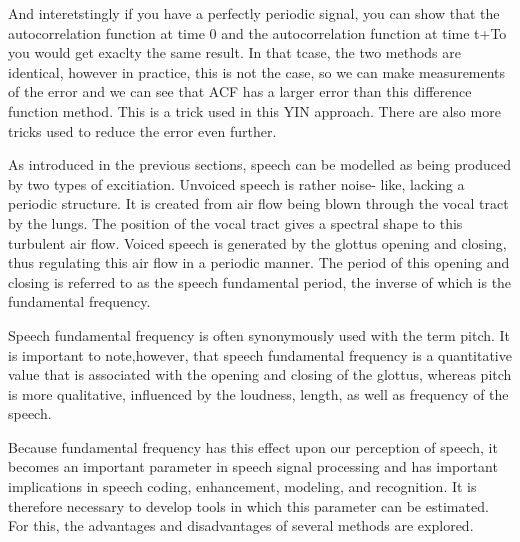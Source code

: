 And interetstingly if you have a perfectly periodic signal, you can show that the autocorrelation function at time 0 and the autocorrelation function at time t+To you would get exaclty the same result. In that tcase, the two methods are identical, however in practice, this is not the case, so we can make measurements of the error and we can see that ACF has a larger error than this difference function method. This is a trick used in this YIN approach.  There are also more tricks used to reduce the error even further.  




























As introduced in the previous sections, speech can be modelled as being produced by two types of excitiation. Unvoiced speech is rather noise- like, lacking a periodic structure.  It is created from air flow being blown through the vocal tract by the lungs. The position of the vocal tract gives a spectral shape to this turbulent air flow.  Voiced speech is generated by the glottus opening and closing, thus regulating this air flow in a periodic manner.  The period of this opening and closing is referred to as the speech fundamental period, the inverse of which is the fundamental frequency.

Speech fundamental frequency is often synonymously used with the term pitch.  It is important to note,however, that speech fundamental frequency is a quantitative value that is associated with the opening and closing of the glottus, whereas pitch is more qualitative, influenced by the loudness, length, as well as frequency of the speech.

Because fundamental frequency has this effect upon our perception of speech, it becomes an important parameter in speech signal processing and has important implications in speech coding, enhancement, modeling, and recognition.  It is therefore necessary to develop tools in which this parameter can be estimated.  For this, the advantages and disadvantages of several methods are explored.



